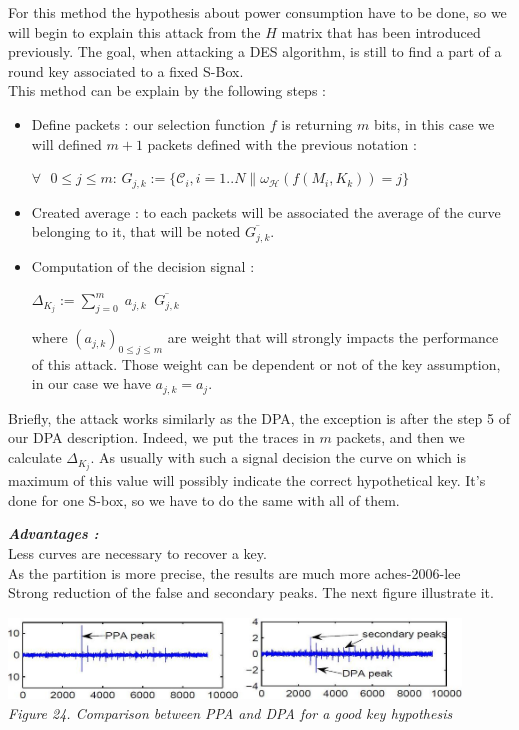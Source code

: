 For this method the hypothesis about power consumption have to be done,
so we will begin to explain this attack from the $H$ matrix that has been introduced previously.
The goal, when attacking a DES algorithm, is still to find a part of a round key associated to 
a fixed S-Box.\\
This method can be explain by the following steps :

\begin{itemize}
\item Define packets :
our selection function $f$ is returning $m$ bits, in this case we will defined $m+1$
packets defined with the previous notation :
\begin{center}$\forall \mbox{ }0 \leq j \leq m$: $G_{j,k} := \{\mathcal{C}_i,i=1..N
\|\omega_{\mathcal{H}}(f(M_i,K_k))=j \}$\\
\end{center}
\item Created average : to each packets will be associated the average of the curve 
belonging to it, that will be noted  $\overline{G_{j,k}}$.
\item Computation of the decision signal :
\begin{center}
$ \Delta_{K_j}  := \sum\limits_{j=0}^{m} \; a_{j,k}\;\; \overline{G_{j,k}}$
\end{center}
where $(a_{j,k})_{0 \leq j \leq m }$ are weight that will strongly impacts the performance
of this attack. Those weight can be dependent or not of the key assumption, in our case we have
$ a_{j,k} =  a_j $.
\end{itemize}
 Briefly, the attack works similarly as the DPA,
 the exception is after the step 5 of our DPA description. Indeed, 
we put the traces in $m$ packets, and then we calculate $ \Delta_{K_j}$.
As usually with such a signal decision the curve on which is maximum of this value will 
possibly indicate the correct hypothetical key. 
It's done for one S-box, so we have to do the same with all of them.

\textbf{\textit{Advantages :}}\\
Less curves are necessary to recover a key.\\
As the partition is more precise, the results are much more a{ches-2006-lee}\\
Strong reduction of the false and secondary peaks. The  next figure illustrate it.

\begin{center}
\includegraphics[width=120mm,height=22mm]{images/illustrationPPA.jpg}\\
\textit{Figure 24. Comparison between PPA and DPA for a good key hypothesis}
\end{center}

